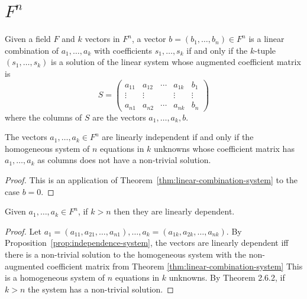 
\section{$F^n$}


\begin{theorem}\label{thm:linear-combination-system}
    Given a field $F$ and $k$ vectors in $F^n$, a vector $b = (b_1, \ldots, b_n) \in F^n$ is a linear combination of $a_1, \ldots, a_k$ with coefficients $s_1, \ldots, s_k$ if and only if the $k$-tuple $(s_1, \ldots, s_k)$ is a solution of the linear system whose augmented coefficient matrix is
    \[
    S = \begin{pmatrix}
    a_{11} & a_{12} & \cdots & a_{1k} & b_1 \\
    \vdots & \vdots & & \vdots & \vdots \\
    a_{n1} & a_{n2} & \cdots & a_{nk} & b_n
    \end{pmatrix}
    \]
    where the columns of $S$ are the vectors $a_1, \ldots, a_k, b$.
\end{theorem}

\begin{proposition}\label{prop:independence-system}
    The vectors $a_1, \ldots, a_k \in F^n$ are linearly independent if and only if the homogeneous system of $n$ equations in $k$ unknowns whose coefficient matrix has $a_1, \ldots, a_k$ as columns does not have a non-trivial solution.
\end{proposition}

\begin{proof}
    This is an application of Theorem~\ref{thm:linear-combination-system} to the case $b = 0$.
\end{proof}

\begin{theorem}\label{thm:more-than-n-dependent}
    Given $a_1, \ldots, a_k \in F^n$, if $k > n$ then they are linearly dependent.
\end{theorem}

\begin{proof}
    Let $a_1 = (a_{11}, a_{21}, \ldots, a_{n1}), \ldots, a_k = (a_{1k}, a_{2k}, \ldots, a_{nk})$. By Proposition~\ref{prop:independence-system}, the vectors are linearly dependent iff there is a non-trivial solution to the homogeneous system with the non-augmented coefficient matrix from Theorem \ref{thm:linear-combination-system}
    This is a homogeneous system of $n$ equations in $k$ unknowns. By Theorem 2.6.2, if $k > n$ the system has a non-trivial solution.
\end{proof}

